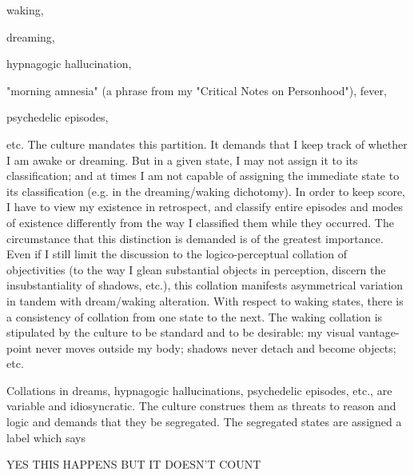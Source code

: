     waking,

    dreaming,

    hypnagogic hallucination,

    "morning amnesia" (a phrase from my "Critical Notes on Personhood"), fever,

    psychedelic episodes,

etc. The culture mandates this partition. It demands that I keep track of whether I am awake or dreaming. But in a given state, I may not assign it to its classification; and at times I am not capable of assigning the immediate state to its classification (e.g. in the dreaming/waking dichotomy). In order to keep score, I have to view my existence in retrospect, and classify entire episodes and modes of existence differently from the way I classified them while they occurred. The circumstance that this distinction is demanded is of the greatest importance. Even if I still limit the discussion to the logico-perceptual collation of objectivities (to the way I glean substantial objects in perception, discern the insubstantiality of shadows, etc.), this collation manifests asymmetrical variation in tandem with dream/waking alteration. With respect to waking states, there is a consistency of collation from one state to the next. The waking collation is stipulated by the culture to be standard and to be desirable: my visual vantage-point never moves outside my body; shadows never detach and become objects; etc.

Collations in dreams, hypnagogic hallucinations, psychedelic episodes, etc., are variable and idiosyncratic. The culture construes them as threats to reason and logic and demands that they be segregated. The segregated states are assigned a label which says

    YES THIS HAPPENS BUT IT DOESN'T COUNT

